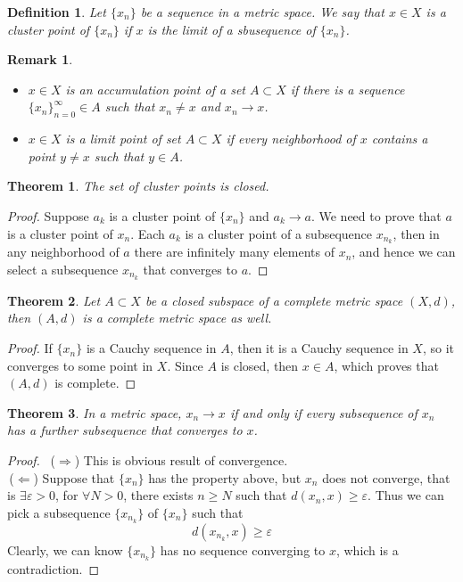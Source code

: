 \documentclass[12pt,leqno]{amsart}
\newtheorem{theorem}{Theorem}[section]
\newtheorem{definition}{Definition}[section]
\newtheorem{remark}{Remark}[section]
\theoremstyle{definition}
\begin{document}
\begin{definition}
Let $\{x_n\}$ be a sequence in a metric space. We say that $x\in X$ is a cluster point of $\{x_n\}$ if $x$ is the limit of a sbusequence of $\{x_n\}$.
\end{definition}
\begin{remark}
$ $
\begin{itemize}
  \item $x\in X$ is an accumulation point of a set $A\subset X$ if there is a sequence $\{x_n\}^\infty_{n=0}\in A$ such that $x_n\neq x$ and $x_n \rightarrow x$.
  \item $x\in X$ is a limit point of set $A\subset X$ if every neighborhood of $x$ contains a point $y\neq x$ such that $y\in A$.
\end{itemize}
\end{remark}

\medskip

\begin{theorem}
The set of cluster points is closed.
\end{theorem}
\begin{proof}
Suppose $a_k$ is a cluster point of $\{x_n\}$ and $a_k\to a$. We need to prove that $a$ is a cluster point of $x_n$. Each $a_k$ is a cluster point of a subsequence $x_{n_k}$, then in any neighborhood of $a$ there are infinitely many elements of $x_n$, and hence we can select a subsequence $x_{n_k}$ that converges to $a$.
\end{proof}

\begin{theorem}
Let $A\subset X$ be a closed subspace of a complete metric space $(X,d)$, then $(A,d)$ is a complete metric space as well.
\end{theorem}
\begin{proof}
If $\{x_n\}$ is a Cauchy sequence in $A$, then it is a Cauchy sequence in $X$, so it converges to some point in $X$. Since $A$ is closed, then $x\in A$, which proves that $(A,d)$ is complete.
\end{proof}

\begin{theorem}
In a metric space, $x_n\to x$ if and only if every subsequence of $x_n$ has a further subsequence that converges to $x$. 
\end{theorem}
\begin{proof}
$ $\newline
\hspace*{1em}\,($\Rightarrow$) This is obvious result of convergence. \\
\hspace*{1em}\,($\Leftarrow$) Suppose that $\{x_n\}$ has the property above, but $x_n$ does not converge, that is $\exists \varepsilon > 0$, for $\forall N > 0$, there exists $n \geq N$ such that $d(x_n,x)\geq\varepsilon$. Thus we can pick a subsequence $\{x_{n_k}\}$ of $\{x_n\}$ such that
$$d(x_{n_k},x)\geq\varepsilon$$
Clearly, we can know $\{x_{n_k}\}$ has no sequence converging to $x$, which is a contradiction.
\end{proof}
\end{document}
